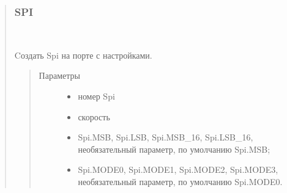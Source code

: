 \documentclass[a4paper,10pt,russian]{sphinxmanual}
\begin{document}
\begin{quote}
\begin{fulllineitems}
\begin{fulllineitems}
\begin{quote}
\begin{description}
\end{description}\end{quote}

\end{fulllineitems}


\end{fulllineitems}



%
\begin{sphinxVerbatim}[commandchars=\\\{\}]
    
 
\end{sphinxVerbatim}


\subsubsection{SPI}
\label{\detokenize{programming/lua/lua:spi}}

\begin{fulllineitems}
\label{\detokenize{programming/lua/lua:Spi}}~

\begin{fulllineitems}
\label{\detokenize{programming/lua/lua:Spi.new}}
Cоздать Spi на порте с настройками.
\begin{quote}\begin{description}
\item[{Параметры}] \leavevmode\begin{itemize}
\item {} 
 \textendash{} номер Spi

\item {} 
 \textendash{} скорость

\item {} 
 \textendash{} Spi.MSB, Spi.LSB, Spi.MSB\_16, Spi.LSB\_16, необязательный параметр, по умолчанию Spi.MSB;

\item {} 
 \textendash{} Spi.MODE0, Spi.MODE1, Spi.MODE2, Spi.MODE3, необязательный параметр, по умолчанию Spi.MODE0.


\end{itemize}
\end{description}
\end{quote}
\end{fulllineitems}
\end{fulllineitems}
\end{quote}
\end{document}
